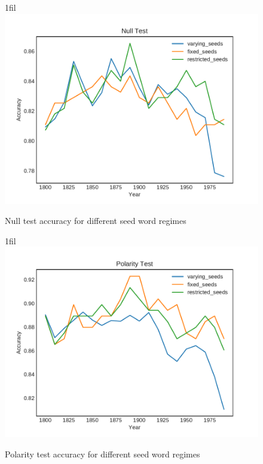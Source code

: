 \documentclass{article}
\makeatletter
\newcommand*{\centerfloat}{%
  \parindent \z@
  \leftskip \z@ \@plus 1fil \@minus \textwidth
  \rightskip\leftskip
  \parfillskip \z@skip}
\makeatother
\begin{document}
\begin{figure}[H]
    \centerfloat
    \includegraphics[width=1.5\linewidth]{classification-centroid-fixed-varying-restricted-seeds/results_null_test.pdf}
    \caption{Null test accuracy for different seed word regimes}
    \label{fig:seeds-null}
\end{figure}

\begin{figure}[H]
    \centerfloat
    \includegraphics[width=1.5\linewidth]{classification-centroid-fixed-varying-restricted-seeds/results_polarity_test.pdf}
    \caption{Polarity test accuracy for different seed word regimes}
    \label{fig:seeds-polarity}
\end{figure}
\end{document}
